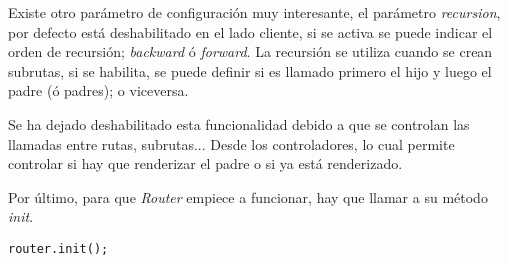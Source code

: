 Existe otro parámetro de configuración muy interesante, el parámetro \emph{recursion}, por defecto está deshabilitado en el lado cliente, si se activa se puede indicar el orden de recursión; \emph{backward} ó \emph{forward}. La recursión se utiliza cuando se crean subrutas, si se habilita, se puede definir si es llamado primero el hijo y luego el padre (ó padres); o viceversa.

Se ha dejado deshabilitado esta funcionalidad debido a que se controlan las llamadas entre rutas, subrutas... Desde los controladores, lo cual permite controlar si hay que renderizar el padre o si ya está renderizado.

Por último, para que \emph{Router} empiece a funcionar, hay que llamar a su método \emph{init}.

    \begin{lstlisting}
router.init();
    \end{lstlisting}